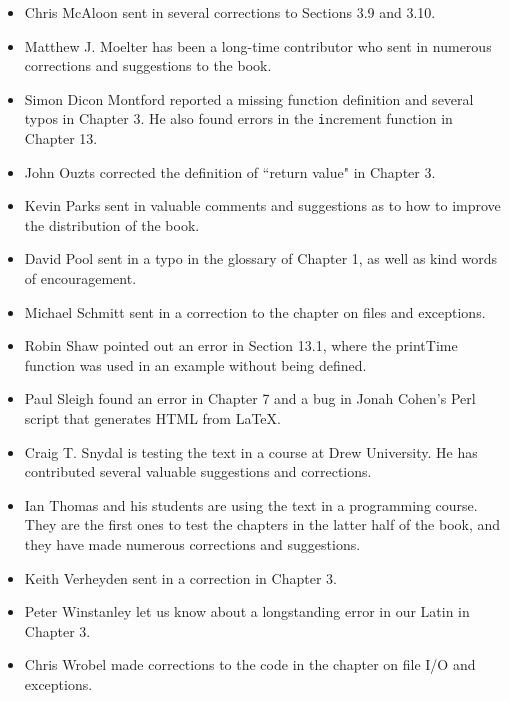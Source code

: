 \documentclass[
DIV=11,
fontsize=13,
twoside,
headinclude=false,
titlepage=firstiscover,
abstract=true,
headsepline=true,
footsepline=true,
chapterprefix=true, %
headings=big,
bibliography=totoc,%
captions=tableheading
]{scrbook}
\theoremstyle{definition}
\begin{document}
\begin{itemize}
\item Chris McAloon sent in several corrections to Sections 3.9 and
3.10.

\item Matthew J. Moelter has been a long-time contributor who sent
in numerous corrections and suggestions to the book.  

\item Simon Dicon Montford reported a missing function definition and
several typos in Chapter 3.  He also found errors in the {\texttt increment}
function in Chapter 13.

\item John Ouzts corrected the definition of ``return value"
in Chapter 3.

\item Kevin Parks sent in valuable comments and suggestions as to how
to improve the distribution of the book.

\item David Pool sent in a typo in the glossary of Chapter 1, as well
as kind words of encouragement.

\item Michael Schmitt sent in a correction to the chapter on files
and exceptions.

\item Robin Shaw pointed out an error in Section 13.1, where the
printTime function was used in an example without being defined.

\item Paul Sleigh found an error in Chapter 7 and a bug in Jonah Cohen's
Perl script that generates HTML from LaTeX.

\item Craig T. Snydal is testing the text in a course at Drew
University.  He has contributed several valuable suggestions and corrections.

\item Ian Thomas and his students are using the text in a programming
course.  They are the first ones to test the chapters in the latter half
of the book, and they have made numerous corrections and suggestions.

\item Keith Verheyden sent in a correction in Chapter 3.

\item Peter Winstanley let us know about a longstanding error in
our Latin in Chapter 3.

\item Chris Wrobel made corrections to the code in the chapter on
file I/O and exceptions. 


\end{itemize}
\end{document}
